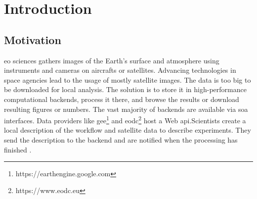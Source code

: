 \documentclass[draft,final]{vutinfth} %
\begin{document}

\tableofcontents %

\mainmatter

\chapter{Introduction}\label{Introduction}

\section{Motivation}\label{Motivation}\label{Use Cases}
\gls{eo} sciences gathers images of the Earth's surface and atmosphere using instruments and cameras on aircrafts or satellites. Advancing technologies in space agencies lead to the usage of mostly satellite images. The data is too big to be downloaded for local analysis. The solution is to store it in high-performance computational backends, process it there, and browse the results or download resulting figures or numbers. The vast majority of backends are available via \gls{soa} interfaces. Data providers like \gls{gee}\footnote{https://earthengine.google.com} and \gls{eodc}\footnote{https://www.eodc.eu} host a Web \gls{api}.Scientists create a local description of the \gls{workflow} and satellite data to describe experiments. They send the description to the \gls{backend} and are notified when the processing has finished \cite{geocloud}. 
\end{document}
